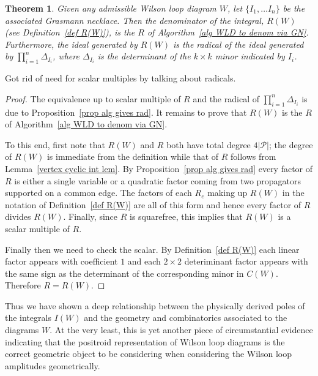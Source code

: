 \documentclass[11pt]{article}
\newtheorem{thm}{Theorem}[section]
\theoremstyle{remark}
\theoremstyle{definition}
\begin{document}
\begin{thm}\label{thm denom}
  Given any admissible Wilson loop diagram $W$, let $\{I_1, \ldots I_n\}$ be the associated Grasmann necklace. Then the denominator of the integral, $R(W)$ (see Definition~\ref{def R(W)}), is the $R$ of Algorithm~\ref{alg WLD to denom via GN}. Furthermore, the ideal generated by $R(W)$ is the radical of the ideal generated by $\prod_{i=1}^n \Delta_{I_i}$, where $\Delta_{I_i}$ is the determinant of the $k \times k$ minor indicated by $I_i$.  
\end{thm}

{\color{violet} Got rid of need for scalar multiples by talking about radicals.}

\begin{proof}
The equivalence up to scalar multiple of $R$ and the radical of $\prod_{i=1}^n \Delta_{I_i}$ is due to Proposition~\ref{prop alg gives rad}.  It remains to prove that $R(W)$ is the $R$ of Algorithm~\ref{alg WLD to denom via GN}.

To this end, first note that $R(W)$ and $R$ both have total degree $4|\mathcal{P}|$; the degree of $R(W)$ is immediate from the definition while that of $R$ follows from Lemma~\ref{vertex cyclic int lem}.  By Proposition~\ref{prop alg gives rad} every factor of $R$ is either a single variable or a quadratic factor coming from two propagators supported on a common edge.  The factors of each $R_e$ making up $R(W)$ in the notation of Definition~\ref{def R(W)} are all of this form and hence every factor of $R$ divides $R(W)$.
Finally, since $R$ is squarefree, this implies that $R(W)$ is a scalar multiple of $R$.

Finally then we need to check the scalar.  By Definition~\ref{def R(W)} each linear factor appears with coefficient $1$ and each $2\times 2$ deteriminant factor appears with the same sign as the determinant of the corresponding minor in $C(W)$.  Therefore $R=R(W)$. 
\end{proof}

Thus we have shown a deep relationship between the physically derived poles of the integrals $I(W)$ and the geometry and combinatorics associated to the diagrams $W$. At the very least, this is yet another piece of circumstantial evidence indicating that the positroid representation of Wilson loop diagrams is the correct geometric object to be considering when considering the Wilson loop amplitudes geometrically. 
\end{document}
